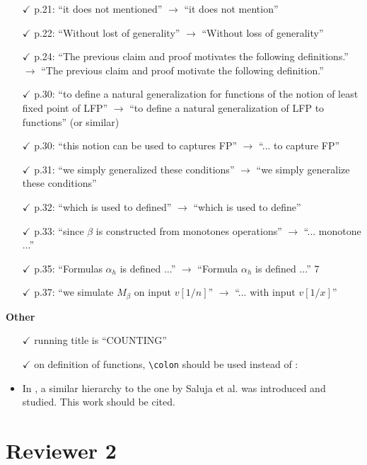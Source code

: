 \documentclass[a4paper]{article}
\begin{document}
\begin{itemize}
	\item[$\checkmark$] p.21: ``it does not mentioned'' $\to$ ``it does not mention''
	\item[$\checkmark$] p.22: ``Without lost of generality'' $\to$ ``Without loss of generality''
	\item[$\checkmark$] p.24: ``The previous claim and proof motivates the following definitions.'' $\to$ ``The previous
	claim and proof motivate the following definition.''
	\item[$\checkmark$] p.30: ``to define a natural generalization for functions of the notion of least fixed point of
	LFP'' $\to$ ``to define a natural generalization of LFP to functions'' (or similar)
	\item[$\checkmark$] p.30: ``this notion can be used to captures FP'' $\to$ ``... to capture FP''
	\item[$\checkmark$] p.31: ``we simply generalized these conditions'' $\to$ ``we simply generalize these conditions''
	\item[$\checkmark$] p.32: ``which is used to defined'' $\to$ ``which is used to define''
	\item[$\checkmark$] p.33: ``since $\beta$ is constructed from monotones operations'' $\to$ ``... monotone ...''
	\item[$\checkmark$] p.35: ``Formulas $\alpha_h$ is defined ...'' $\to$ ``Formula $\alpha_h$ is defined ...''
	7
	\item[$\checkmark$] p.37: ``we simulate $M_\beta$ on input $v[1/n]$'' $\to$ ``... with input $v[1/x]$''
\end{itemize}
\vspace{1em}
{\bf Other}
\begin{itemize}
	\setlength\itemsep{0.5em}
	\item[$\checkmark$] running title is ``COUNTING''
	\item[$\checkmark$] on definition of functions, \verb|\colon| should be used instead of :
	\item In \cite{DBLP:conf/csl/0001HKV16}, a similar hierarchy to the one by Saluja et al. was introduced and studied. This work should be cited.
\end{itemize}

\bigskip

\section*{Reviewer 2}
\end{document}
